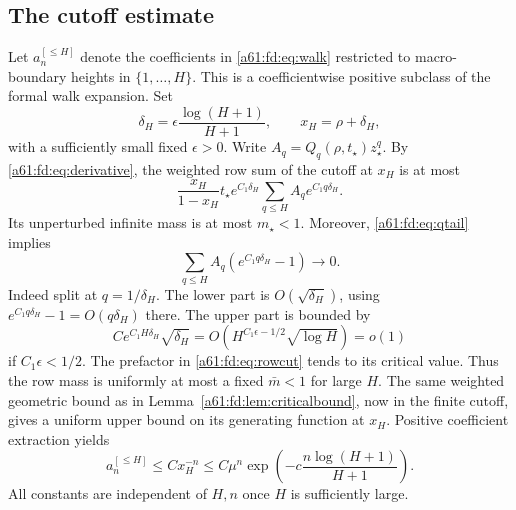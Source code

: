 \documentclass[11pt,letterpaper]{article}
\numberwithin{equation}{section}
\theoremstyle{remark}\newtheorem{remark}[theorem]{Remark}
\newcommand{\st}{\star}
\begin{document}
\subsection{The cutoff estimate}
Let $a_n^{[\le H]}$ denote the coefficients in \eqref{a61:fd:eq:walk} restricted to macro-boundary heights in $\{1,\ldots,H\}$. This is a coefficientwise positive subclass of the formal walk expansion. Set
\[
 \delta_H=\epsilon\frac{\log(H+1)}{H+1},\qquad x_H=\rho+\delta_H,
\]
with a sufficiently small fixed $\epsilon>0$. Write $A_q=Q_q(\rho,t_\st)z_\st^q$. By \eqref{a61:fd:eq:derivative}, the weighted row sum of the cutoff at $x_H$ is at most
\begin{equation}\label{a61:fd:eq:rowcut}
 \frac{x_H}{1-x_H}t_\st e^{C_1\delta_H}
       \sum_{q\le H}A_qe^{C_1q\delta_H}.
\end{equation}
Its unperturbed infinite mass is at most $m_\st<1$. Moreover, \eqref{a61:fd:eq:qtail} implies
\begin{equation}\label{a61:fd:eq:tailperturb}
 \sum_{q\le H}A_q(e^{C_1q\delta_H}-1)\longrightarrow0.
\end{equation}
Indeed split at $q=1/\delta_H$. The lower part is $O(\sqrt{\delta_H})$, using $e^{C_1q\delta_H}-1=O(q\delta_H)$ there. The upper part is bounded by
\[
 C e^{C_1H\delta_H}\sqrt{\delta_H}
 =O\!\left(H^{C_1\epsilon-1/2}\sqrt{\log H}\right)=o(1)
\]
if $C_1\epsilon<1/2$. The prefactor in \eqref{a61:fd:eq:rowcut} tends to its critical value. Thus the row mass is uniformly at most a fixed $\bar m<1$ for large $H$. The same weighted geometric bound as in Lemma~\ref{a61:fd:lem:criticalbound}, now in the finite cutoff, gives a uniform upper bound on its generating function at $x_H$. Positive coefficient extraction yields
\begin{equation}\label{a61:fd:eq:cutbound}
 a_n^{[\le H]}\le Cx_H^{-n}
 \le C\mu^n\exp\!\left(-c\frac{n\log(H+1)}{H+1}\right).
\end{equation}
All constants are independent of $H,n$ once $H$ is sufficiently large.
\end{document}
